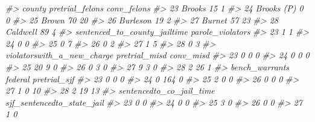 \documentclass[
  12pt,
  openany]{book}
\newenvironment{Shaded}{\begin{snugshade}}{\end{snugshade}}
\newcommand{\CommentTok}[1]{\textcolor[rgb]{0.37,0.37,0.37}{\textit{#1}}}
\begin{document}
\begin{Shaded}
\begin{Highlighting}[]
\CommentTok{\#\textgreater{}        county pretrial\_felons conv\_felons}
\CommentTok{\#\textgreater{} 23     Brooks              15           1}
\CommentTok{\#\textgreater{} 24 Brooks (P)               0           0}
\CommentTok{\#\textgreater{} 25      Brown              70          20}
\CommentTok{\#\textgreater{} 26   Burleson              19           2}
\CommentTok{\#\textgreater{} 27     Burnet              57          23}
\CommentTok{\#\textgreater{} 28   Caldwell              89           4}
\CommentTok{\#\textgreater{}    sentenced\_to\_county\_jailtime parole\_violators}
\CommentTok{\#\textgreater{} 23                            1                1}
\CommentTok{\#\textgreater{} 24                            0                0}
\CommentTok{\#\textgreater{} 25                            0                7}
\CommentTok{\#\textgreater{} 26                            0                2}
\CommentTok{\#\textgreater{} 27                            1                5}
\CommentTok{\#\textgreater{} 28                            0                3}
\CommentTok{\#\textgreater{}    violatorswith\_a\_new\_charge pretrial\_misd conv\_misd}
\CommentTok{\#\textgreater{} 23                          0             0         0}
\CommentTok{\#\textgreater{} 24                          0             0         0}
\CommentTok{\#\textgreater{} 25                         20             9         0}
\CommentTok{\#\textgreater{} 26                          0             3         0}
\CommentTok{\#\textgreater{} 27                          9             3         0}
\CommentTok{\#\textgreater{} 28                          2            26         1}
\CommentTok{\#\textgreater{}    bench\_warrants federal pretrial\_sjf}
\CommentTok{\#\textgreater{} 23              0       0            0}
\CommentTok{\#\textgreater{} 24              0     164            0}
\CommentTok{\#\textgreater{} 25              2       0            0}
\CommentTok{\#\textgreater{} 26              0       0            0}
\CommentTok{\#\textgreater{} 27              1       0           10}
\CommentTok{\#\textgreater{} 28              2      19           13}
\CommentTok{\#\textgreater{}    sentencedto\_co\_jail\_time sjf\_sentencedto\_state\_jail}
\CommentTok{\#\textgreater{} 23                        0                          0}
\CommentTok{\#\textgreater{} 24                        0                          0}
\CommentTok{\#\textgreater{} 25                        3                          0}
\CommentTok{\#\textgreater{} 26                        0                          0}
\CommentTok{\#\textgreater{} 27                        1                          0}

\end{Highlighting}
\end{Shaded}
\end{document}
